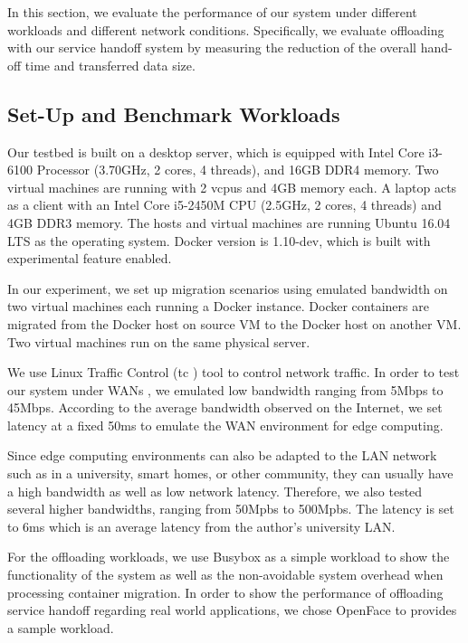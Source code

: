 
In this section, we evaluate the performance of our system under different workloads and different network conditions. 
Specifically, we evaluate offloading with our service handoff system by measuring the reduction of the overall hand-off time and  transferred data size.

\subsection{Set-Up and Benchmark Workloads}

Our testbed is built on a desktop server, which is equipped with Intel Core i3-6100 Processor (3.70GHz, 2 cores, 4 threads), and 16GB DDR4 memory. Two virtual machines are running with 2 vcpus and 4GB memory each.
A laptop acts as a client with an Intel Core i5-2450M CPU (2.5GHz, 2 cores, 4 threads) and 4GB DDR3 memory. 
The hosts and virtual machines are running Ubuntu 16.04 LTS as the operating system. Docker version is 1.10-dev, which is built with experimental feature enabled.

In our experiment, we set up migration scenarios using 
emulated bandwidth on two virtual machines each running a Docker instance.
Docker containers are migrated from the Docker host on source VM to the Docker host on another VM. 
Two virtual machines run on the same physical server. 

We use Linux Traffic Control (tc\cite{tc} )  tool to control network traffic. In order to test our system under WANs , we emulated low bandwidth ranging from 5Mbps to 45Mbps. According to the average bandwidth observed on the Internet\cite{internet2014state}, we set  latency at a fixed 50ms to emulate the WAN environment for edge computing.

Since edge computing environments can also be adapted to the LAN network such as in a university, smart homes, or other community, they can usually have a high bandwidth as well as low network latency. Therefore, we also tested several higher bandwidths, ranging from 50Mpbs to 500Mpbs. The latency is set to 6ms which is an average latency from the author's university LAN.

For the offloading workloads, we use Busybox as a simple workload to show the functionality of the system as well as the non-avoidable system overhead when processing container migration. In order to show the performance of offloading service handoff regarding real world applications, we chose OpenFace to provides a sample workload.

